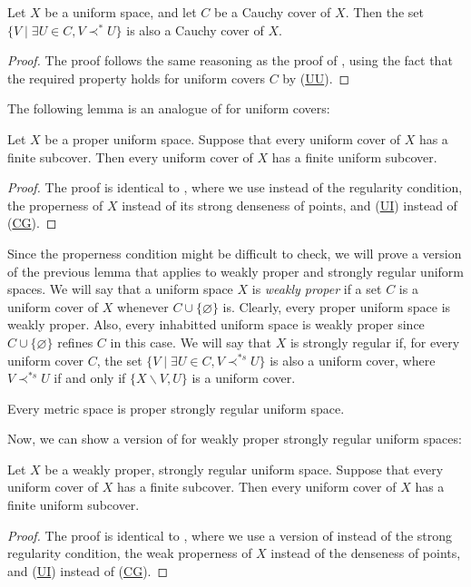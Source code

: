 \documentclass[reqno]{amsart}
\newcommand{\axref}[1]{(\hyperref[ax:#1]{#1})}
\theoremstyle{definition}
\theoremstyle{remark}
\numberwithin{figure}{section}
\newcommand{\rb}{\prec}
\begin{document}
\begin{lem}
Let $X$ be a uniform space, and let $C$ be a Cauchy cover of $X$.
Then the set $\{ V \mid \exists U \in C, V \rb^* U \}$ is also a Cauchy cover of $X$.
\end{lem}
\begin{proof}
The proof follows the same reasoning as the proof of , using the fact that the required property holds for uniform covers $C$ by \axref{UU}.
\end{proof}

The following lemma is an analogue of  for uniform covers:

\begin{lem}[tb-cauchy]
Let $X$ be a proper uniform space.
Suppose that every uniform cover of $X$ has a finite subcover.
Then every uniform cover of $X$ has a finite uniform subcover.
\end{lem}
\begin{proof}
The proof is identical to , where we use  instead of the regularity condition, the properness of $X$ instead of its strong denseness of points, and \axref{UI} instead of \axref{CG}.
\end{proof}

Since the properness condition might be difficult to check, we will prove a version of the previous lemma that applies to weakly proper and strongly regular uniform spaces.
We will say that a uniform space $X$ is \emph{weakly proper} if a set $C$ is a uniform cover of $X$ whenever $C \cup \{ \varnothing \}$ is.
Clearly, every proper uniform space is weakly proper.
Also, every inhabitted uniform space is weakly proper since $C \cup \{ \varnothing \}$ refines $C$ in this case.
We will say that $X$ is strongly regular if, for every uniform cover $C$, the set $\{ V \mid \exists U \in C, V \rb^{*s} U \}$ is also a uniform cover,
where $V \rb^{*s} U$ if and only if $\{ X \backslash V, U \}$ is a uniform cover.

\begin{example}
Every metric space is proper strongly regular uniform space.
\end{example}

Now, we can show a version of  for weakly proper strongly regular uniform spaces:

\begin{lem}[tb-ws-cauchy]
Let $X$ be a weakly proper, strongly regular uniform space.
Suppose that every uniform cover of $X$ has a finite subcover.
Then every uniform cover of $X$ has a finite uniform subcover.
\end{lem}
\begin{proof}
The proof is identical to , where we use a version of  instead of the strong regularity condition, the weak properness of $X$ instead of the denseness of points, and \axref{UI} instead of \axref{CG}.
\end{proof}
\end{document}
